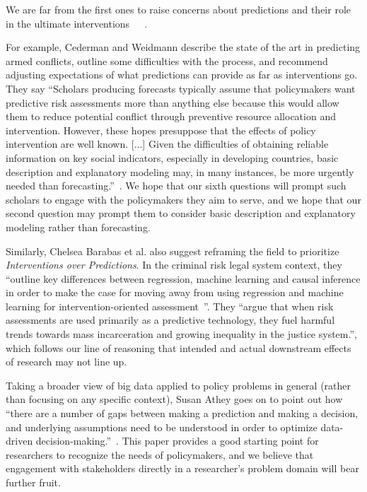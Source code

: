 \documentclass[12pt]{article}
\begin{document}
    We are far from the first ones to raise concerns about predictions and their role in the ultimate interventions~\cite{armed-conflict}~\cite{interventions-over-predictions}~\cite{beyond-prediction}. 
    
    For example, Cederman and Weidmann describe the state of the art in predicting armed conflicts, outline some difficulties with the process, and recommend adjusting expectations of what predictions can provide as far as interventions go. They say ``Scholars producing forecasts typically assume that policymakers want predictive risk assessments more than anything else because this would allow them to reduce potential conflict through preventive resource allocation and intervention. However, these hopes presuppose that the effects of policy intervention are well known. [...] Given the difficulties of obtaining reliable information on key social indicators, especially in developing countries, basic description and explanatory modeling may, in many instances, be more urgently needed than forecasting.''~\cite{armed-conflict}. We hope that our sixth questions will prompt such scholars to engage with the policymakers they aim to serve, and we hope that our second question may prompt them to consider basic description and explanatory modeling rather than forecasting. 
    
    Similarly, Chelsea Barabas et al. also suggest reframing the field to prioritize \textit{Interventions over Predictions}. In the criminal risk legal system context, they ``outline key differences between regression, machine learning and causal inference in order to make the case for moving away from using regression and machine learning for intervention-oriented assessment~\cite{interventions-over-predictions}''. They ``argue that when risk assessments are used primarily as a predictive technology, they fuel harmful trends towards mass incarceration and growing inequality in the justice system.'', which follows our line of reasoning that intended and actual downstream effects of research may not line up. 
    
    Taking a broader view of big data applied to policy problems in general (rather than focusing on any specific context), Susan Athey goes on to point out how ``there are a number of gaps between making a prediction and making a decision, and underlying assumptions need to be understood in order to optimize data-driven decision-making.''~\cite{beyond-prediction}. This paper provides a good starting point for researchers to recognize the needs of policymakers, and we believe that engagement with stakeholders directly in a researcher's problem domain will bear further fruit. 
\end{document}

